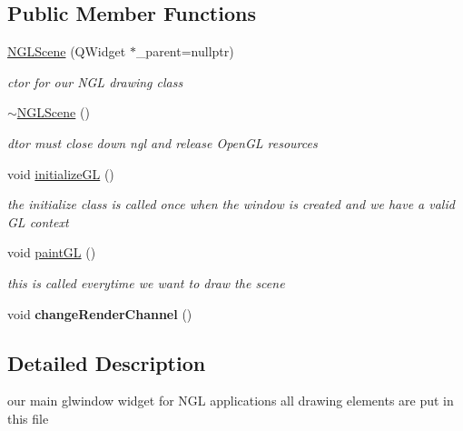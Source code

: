 \subsection*{Public Member Functions}
\begin{DoxyCompactItemize}
\item 
\hyperlink{classNGLScene_a15c28d86bb9083dee9fa92b6941b76f1}{N\-G\-L\-Scene} (Q\-Widget $\ast$\-\_\-parent=nullptr)
\begin{DoxyCompactList}\small\item\em ctor for our N\-G\-L drawing class \end{DoxyCompactList}\item 
\hypertarget{classNGLScene_abda05d130945833bfbb6bad8d619f7f5}{\hyperlink{classNGLScene_abda05d130945833bfbb6bad8d619f7f5}{$\sim$\-N\-G\-L\-Scene} ()}\label{classNGLScene_abda05d130945833bfbb6bad8d619f7f5}

\begin{DoxyCompactList}\small\item\em dtor must close down ngl and release Open\-G\-L resources \end{DoxyCompactList}\item 
void \hyperlink{classNGLScene_aab2b866db534d286a56cc2240ed98790}{initialize\-G\-L} ()
\begin{DoxyCompactList}\small\item\em the initialize class is called once when the window is created and we have a valid G\-L context \end{DoxyCompactList}\item 
\hypertarget{classNGLScene_a37bec65bfba7b7a717d803d369221e2d}{void \hyperlink{classNGLScene_a37bec65bfba7b7a717d803d369221e2d}{paint\-G\-L} ()}\label{classNGLScene_a37bec65bfba7b7a717d803d369221e2d}

\begin{DoxyCompactList}\small\item\em this is called everytime we want to draw the scene \end{DoxyCompactList}\item 
\hypertarget{classNGLScene_ac228e4d41afa023733b163d2128c78fb}{void {\bfseries change\-Render\-Channel} ()}\label{classNGLScene_ac228e4d41afa023733b163d2128c78fb}

\end{DoxyCompactItemize}


\subsection{Detailed Description}
our main glwindow widget for N\-G\-L applications all drawing elements are put in this file 

